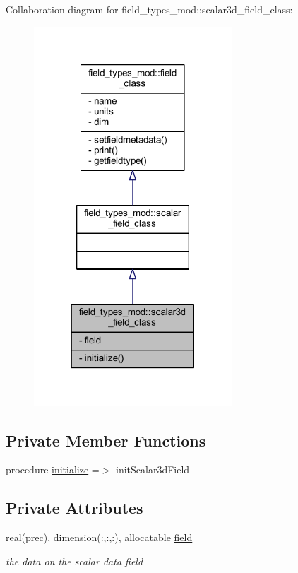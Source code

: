 Collaboration diagram for field\+\_\+types\+\_\+mod\+:\+:scalar3d\+\_\+field\+\_\+class\+:\nopagebreak
\begin{figure}[H]
\begin{center}
\leavevmode
\includegraphics[width=210pt]{structfield__types__mod_1_1scalar3d__field__class__coll__graph}
\end{center}
\end{figure}
\subsection*{Private Member Functions}
\begin{DoxyCompactItemize}
\item 
procedure \mbox{\hyperlink{structfield__types__mod_1_1scalar3d__field__class_a696f26a0bb36050e98be62818c16d5bf}{initialize}} =$>$ init\+Scalar3d\+Field
\end{DoxyCompactItemize}
\subsection*{Private Attributes}
\begin{DoxyCompactItemize}
\item 
real(prec), dimension(\+:,\+:,\+:), allocatable \mbox{\hyperlink{structfield__types__mod_1_1scalar3d__field__class_a28c9545c33bace06357df925d03c7818}{field}}
\begin{DoxyCompactList}\small\item\em the data on the scalar data field \end{DoxyCompactList}\end{DoxyCompactItemize}


